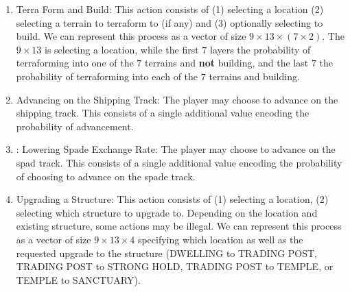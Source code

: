 \documentclass[12pt,twocolumn,letterpaper]{article}
\begin{document}
\begin{enumerate}
    \item Terra Form and Build: This action consists of (1) selecting a location (2) selecting a terrain to terraform to (if any) and (3) optionally selecting to build.  We can represent this process as a vector of size $9 \times 13 \times (7\times 2)$. The $9 \times 13$ is selecting a location, while the first $7$ layers the probability of terraforming into one of the $7$ terrains and \textbf{not} building, and the last $7$ the probability of terraforming into each of the $7$ terrains and building.
    \item Advancing on the Shipping Track: The player may choose to advance on the shipping track. This consists of a single additional value encoding the probability of advancement.
    \item: Lowering Spade Exchange Rate: The player may choose to advance on the spad track. This consists of a single additional value encoding the probability of choosing to advance on the spade track.
    \item Upgrading a Structure: This action consists of (1) selecting a location, (2) selecting which structure to upgrade to. Depending on the location and existing structure, some actions may be illegal. We can represent this process as a vector of size $9 \times 13 \times 4$ specifying which location as well as the requested upgrade to the structure (DWELLING to TRADING POST, TRADING POST to STRONG HOLD, TRADING POST to TEMPLE, or TEMPLE to SANCTUARY).
    

\end{enumerate}
\end{document}
